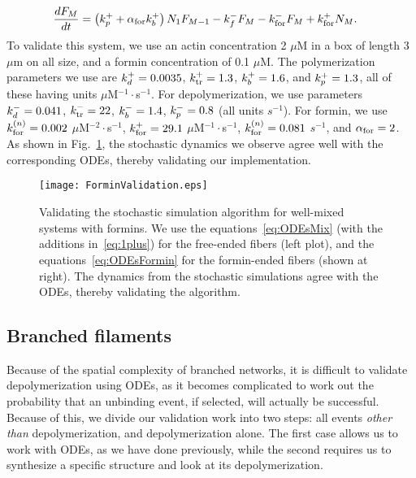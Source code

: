 \documentclass[11pt]{article}
\begin{document}
\begin{appendices}
\begin{subequations}
\begin{align}
\frac{d F_M}{dt} & = \left(k_p^+ +\alpha_\text{for} k_b^+\right)N_1 F_{M-1} - k_f^- F_M - k_\text{for}^- F_M + k_\text{for}^+ N_M.
\end{align}
\end{subequations}
To validate this system, we use an actin concentration 2 $\mu$M in a box of length 3 $\mu$m on all size, and a formin concentration of 0.1 $\mu$M. The polymerization parameters we use are $k_d^+=0.0035$, $k_\text{tr}^+=1.3$, $k_b^+=1.6$, and $k_p^+=1.3$, all of these having units $\mu$M$^{-1}\cdot$s$^{-1}$. For depolymerization, we use parameters $k_d^- = 0.041$, $k_\text{tr}^- = 22$, $k_b^-=1.4$, $k_p^-=0.8$ (all units $s^{-1}$). For formin, we use $k_\text{for}^{(n)} = 0.002$ $\mu$M$^{-2}\cdot$s$^{-1}$, $k_\text{for}^+ = 29.1$ $\mu$M$^{-1}\cdot$s$^{-1}$, $k_\text{for}^{(n)} = 0.081$ $s^{-1}$, and $\alpha_\text{for}=2$. As shown in Fig.\ \ref{fig:ForminValid}, the stochastic dynamics we observe agree well with the corresponding ODEs, thereby validating our implementation.

\begin{figure}
\centering
\texttt{[image: ForminValidation.eps]}
\caption{\label{fig:ForminValid}Validating the stochastic simulation algorithm for well-mixed systems with formins. We use the equations\ \eqref{eq:ODEsMix} (with the additions in\ \eqref{eq:1plus}) for the free-ended fibers (left plot), and the equations\ \eqref{eq:ODEsFormin} for the formin-ended fibers (shown at right). The dynamics from the stochastic simulations agree with the ODEs, thereby validating the algorithm. }
\end{figure}

\subsection{Branched filaments}
Because of the spatial complexity of branched networks, it is difficult to validate depolymerization using ODEs, as it becomes complicated to work out the probability that an unbinding event, if selected, will actually be successful. Because of this, we divide our validation work into two steps: all events \emph{other than} depolymerization, and depolymerization alone. The first case allows us to work with ODEs, as we have done previously, while the second requires us to synthesize a specific structure and look at its depolymerization. 


\end{appendices}
\end{document}
